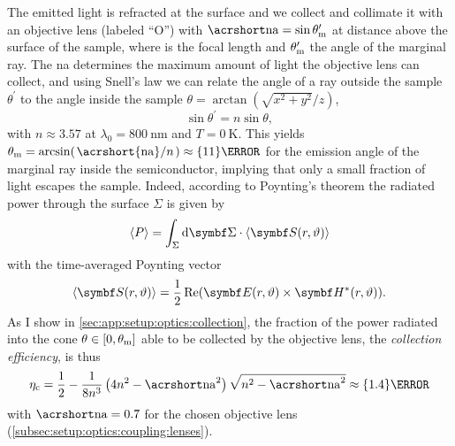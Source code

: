 The emitted light is refracted at the surface and we collect and collimate it with an objective lens (labeled \enquote{O}) with $\NA=\sin\theta^\prime_\mr{m}$ at distance \fob above the surface of the sample, where \fob is the focal length and $\theta^\prime_{\mathrm{m}}$ the angle of the marginal ray.
The \gls{na} determines the maximum amount of light the objective lens can collect, and using Snell's law we can relate the angle of a ray outside the sample $\theta^\prime$ to the angle inside the sample $\theta = \arctan(\sqrt{x^2 + y^2}/z)$,
\begin{equation}\label{eq:setup:optics:coupling:snell}
    \sin\theta^\prime = n\sin\theta,
\end{equation}
with $n\approx 3.57$ at $\lambda_0=\qty{800}{\nano\meter}$ and $T=\qty{0}{\kelvin}$.
This yields $\theta_{\mr{m}} = \arcsin(\flatfrac{\mr{\acrshort{na}}}{n}) \approx\qty{11}{\degree}$ for the emission angle of the marginal ray inside the semiconductor, implying that only a small fraction of light escapes the sample.
Indeed, according to Poynting's theorem the radiated power through the surface $\Sigma$ is given by
\begin{equation}\label{eq:setup:optics:coupling:power}
    \expval{P} = \int_{\Sigma}\dd{\bvec{\Sigma}}\cdot\expval{\bvec{S}(r, \vartheta)}
\end{equation}
with the time-averaged Poynting vector
\begin{equation}\label{eq:setup:optics:coupling:poynting}
    \expval{\bvec{S}(r, \vartheta)} = \frac{1}{2}\re(\bvec{E}(r, \vartheta)\times\bvec{H}^{\ast}(r, \vartheta)).
\end{equation}
As I show in \cref{sec:app:setup:optics:collection}, the fraction of the power radiated into the cone $\theta\in[0, \theta_{\mathrm{m}}]$ able to be collected by the objective lens, the \emph{collection efficiency}, is thus
\begin{equation}\label{eq:setup:optics:coupling:efficiency:collection}
    \eta_{\mr{c}} = \frac{1}{2} - \frac{1}{8 n^3}\left(4n^2 - \NA^2\right)\sqrt{n^2 - \NA^2} \approx \qty{1.4}{\percent}
\end{equation}
with $\NA=\num{0.7}$ for the chosen objective lens (\cf \cref{subsec:setup:optics:coupling:lenses}).

